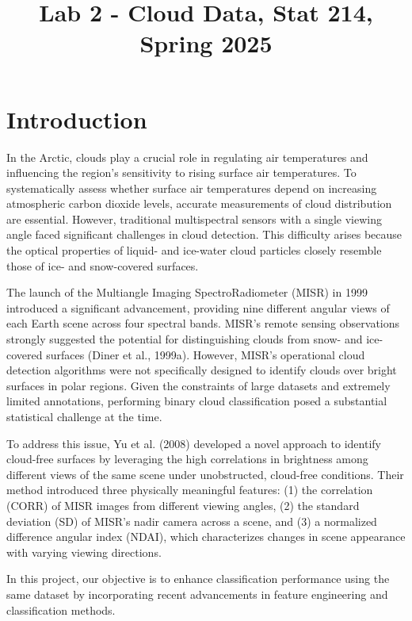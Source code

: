 \documentclass[10pt,letterpaper]{article}
\title{Lab 2 - Cloud Data, Stat 214, Spring 2025\vspace{-2em}}
\begin{document}
\maketitle


\section{Introduction}
In the Arctic, clouds play a crucial role in regulating air temperatures and influencing the region's sensitivity to rising surface air temperatures. To systematically assess whether surface air temperatures depend on increasing atmospheric carbon dioxide levels, accurate measurements of cloud distribution are essential. However, traditional multispectral sensors with a single viewing angle faced significant challenges in cloud detection. This difficulty arises because the optical properties of liquid- and ice-water cloud particles closely resemble those of ice- and snow-covered surfaces.

The launch of the Multiangle Imaging SpectroRadiometer (MISR) in 1999 introduced a significant advancement, providing nine different angular views of each Earth scene across four spectral bands. MISR’s remote sensing observations strongly suggested the potential for distinguishing clouds from snow- and ice-covered surfaces (Diner et al., 1999a). However, MISR’s operational cloud detection algorithms were not specifically designed to identify clouds over bright surfaces in polar regions. Given the constraints of large datasets and extremely limited annotations, performing binary cloud classification posed a substantial statistical challenge at the time.

To address this issue, Yu et al. (2008) developed a novel approach to identify cloud-free surfaces by leveraging the high correlations in brightness among different views of the same scene under unobstructed, cloud-free conditions. Their method introduced three physically meaningful features: (1) the correlation (CORR) of MISR images from different viewing angles, (2) the standard deviation (SD) of MISR’s nadir camera across a scene, and (3) a normalized difference angular index (NDAI), which characterizes changes in scene appearance with varying viewing directions.

In this project, our objective is to enhance classification performance using the same dataset by incorporating recent advancements in feature engineering and classification methods.
\end{document}
